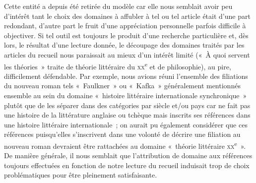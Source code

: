 \documentclass[12pt, a4paper]{article}
\begin{document}
    Cette entité a depuis été retirée du modèle car elle nous semblait avoir peu d'intérêt tant le choix des domaines à affubler à tel ou tel article était d'une part redondant, d'autre part le fruit d'une appréciation personnelle parfois difficile à objectiver. Si tel outil est toujours le produit d'une recherche particulière et, dès lors, le résultat d'une lecture donnée, le découpage des domaines traités par les articles du recueil nous paraissait au mieux d'un intérêt limité («~À quoi servent les théories~» traite de théorie littéraire du \textsc{xx}\textsuperscript{e} et de philosophie), au pire, difficilement défendable. Par exemple, nous avions réuni l'ensemble des filiations du nouveau roman tels «~Faulkner~» ou «~Kafka~» généralement mentionnés ensemble au sein du domaine «~histoire littéraire internationale synchronique~» plutôt que de les séparer dans des catégories par siècle et/ou pays car \robbe{} ne fait pas une histoire de la littérature anglaise ou tchèque mais inscrits ses références dans une histoire littéraire internationale~; on aurait pu également considérer que ces références puisqu'elles s'inscrivent dans une volonté de décrire une filiation au nouveau roman devraient être rattachées au domaine «~théorie littéraire \textsc{xx}\textsuperscript{e}~». De manière générale, il nous semblait que l'attribution de domaine aux références toujours effectuées en fonction de notre lecture du recueil induisait trop de choix problématiques pour être pleinement satisfaisante.



    
\end{document}
